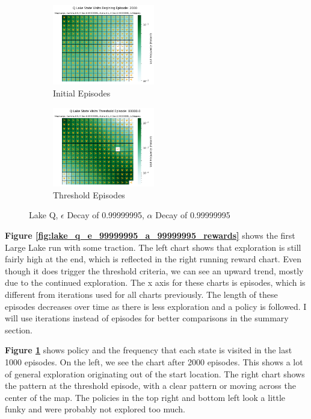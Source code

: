 \documentclass[letterpaper]{article} %
\begin{document}
\begin{figure}[!htb]
	\begin{subfigure}[b]{0.25\textwidth}
		\centering
		\includegraphics[width=1.75in]{Figures/Q_Lake_State_Visits_Begining_Episode__2000_Map_Large__Gamma_0_9__E_Dec_0_99999995__Alpha_0_1__A_Dec_0_99999995__Is_Slippery.png}
		\caption{Initial Episodes}
  	\end{subfigure}%
	\begin{subfigure}[b]{0.25\textwidth}
		\centering
		\includegraphics[width=1.75in]{Figures/Q_Lake_State_Visits_Threshold_Episode__80000_0_Map_Large__Gamma_0_9__E_Dec_0_99999995__Alpha_0_1__A_Dec_0_99999995__Is_Slippery.png}
		\caption{Threshold Episodes}
  	\end{subfigure}%
\caption{Lake Q,  $\epsilon$ Decay of 0.99999995, $\alpha$ Decay of 0.99999995}
\label{fig:lake_q_e_99999995_a_99999995_maps}
\end{figure}

\textbf{Figure \ref{fig:lake_q_e_99999995_a_99999995_rewards}} shows the first Large Lake run with some traction.  The left chart shows that exploration is still fairly high at the end, which is reflected in the right running reward chart.  Even though it does trigger the threshold criteria, we can see an upward trend, mostly due to the continued exploration.  The x axis for these charts is episodes, which is different from iterations used for all charts previously.   The length of these episodes decreases over time as there is less exploration and a policy is followed.   I will use iterations instead of episodes for better comparisons in the summary section.

\textbf{Figure \ref{fig:lake_q_e_99999995_a_99999995_maps}} shows policy and the frequency that each state is visited in the last 1000 episodes.  On the left, we see the chart after 2000 episodes.  This shows a lot of general exploration originating out of the start location.  The right chart shows the pattern at the threshold episode, with a clear pattern or moving across the center of the map.  The policies in the top right and bottom left look a little funky and were probably not explored too much.
\end{document}
